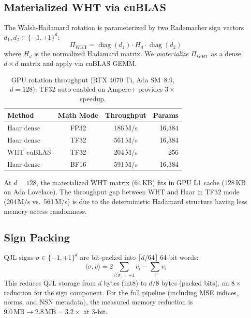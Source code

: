\documentclass[sigconf,anonymous,review]{acmart}
\DeclareMathOperator{\diag}{diag}
\newcommand{\inner}[2]{\langle #1, #2 \rangle}
\begin{document}
\subsection{Materialized WHT via cuBLAS}

The Walsh-Hadamard rotation is parameterized by two Rademacher
sign vectors $d_1, d_2 \in \{-1, +1\}^d$:
\begin{equation}
  \Pi_{\mathrm{WHT}} = \diag(d_1) \cdot H_d \cdot \diag(d_2)
  \label{eq:wht}
\end{equation}
where $H_d$ is the normalized Hadamard matrix.
We \emph{materialize} $\Pi_{\mathrm{WHT}}$ as a dense $d \times d$
matrix and apply via cuBLAS GEMM.

\begin{table}[t]
\centering
\caption{GPU rotation throughput (RTX 4070 Ti, Ada SM~8.9, $d=128$).
TF32 auto-enabled on Ampere+ provides $3\times$ speedup.}
\label{tab:throughput}
\begin{tabular}{lccr}
\toprule
Method & Math Mode & Throughput & Params \\
\midrule
Haar dense  & FP32       & 186\,M/s  & 16{,}384 \\
Haar dense  & TF32       & 561\,M/s  & 16{,}384 \\
WHT cuBLAS  & TF32       & 204\,M/s  & 256 \\
Haar dense  & BF16       & 591\,M/s  & 16{,}384 \\
\bottomrule
\end{tabular}
\end{table}

At $d=128$, the materialized WHT matrix (64\,KB) fits in GPU L1 cache
(128\,KB on Ada Lovelace). The throughput gap between WHT and Haar in
TF32 mode (204\,M/s vs.\ 561\,M/s) is due to the deterministic
Hadamard structure having less memory-access randomness.

\subsection{Sign Packing}

QJL signs $\sigma \in \{-1, +1\}^d$ are bit-packed into
$\lceil d/64 \rceil$ 64-bit words:
\begin{equation}
  \inner{\sigma}{v} = 2 \sum_{i: \sigma_i = +1} v_i - \sum_i v_i
  \label{eq:sign-ip}
\end{equation}
This reduces QJL storage from $d$ bytes (int8) to $d/8$ bytes (packed bits),
an $8\times$ reduction for the sign component. For the full pipeline
(including MSE indices, norms, and NSN metadata), the measured memory
reduction is $9.0\,\text{MB} \to 2.8\,\text{MB} = 3.2\times$ at 3-bit.
\end{document}
